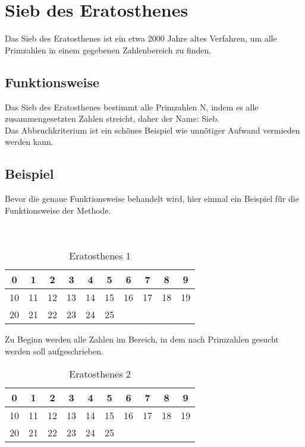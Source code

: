 

	\section{Sieb des Eratosthenes}
	 \label{sec:eratosthenes}
	Das Sieb des Eratosthenes ist ein etwa 2000 Jahre altes Verfahren, um alle Primzahlen in einem gegebenen Zahlenbereich zu finden. 
	\subsection{Funktionsweise}
	Das Sieb des Eratosthenes bestimmt alle Primzahlen N, indem es alle zusammengesetzten Zahlen streicht, daher der Name: Sieb.\\
	Das Abbruchkriterium ist ein sch\"önes Beispiel wie unn\"ötiger Aufwand vermieden werden kann.
	\subsection{Beispiel}
	Bevor die genaue Funktionsweise behandelt wird, hier einmal ein Beispiel f\"ür die Funktionsweise der Methode.\\
	\ \\
	\ \\
	\begin{table}[!ht] 
		\centering
		
		\begin{tabular}{|c|c|c|c|c|c|c|c|c|c|}
			\hline
			0  &  1 &  2 &  3 &  4 &  5 &  6 &  7 &  8 &  9 \\
			\hline
			10 & 11 & 12 & 13 & 14 & 15 & 16 & 17 & 18 & 19 \\
			\hline
			20 & 21 & 22 & 23 & 24 & 25 &  &  &  &  \\
			\hline
		\end{tabular}
		\caption{Eratosthenes 1}
		\label{tab:eratosthenes1}
	\end{table}
	
	Zu Beginn werden alle Zahlen im Bereich, in dem nach Primzahlen gesucht werden soll aufgeschrieben.
	
	\begin{table}[!ht] 
		\centering
		\begin{tabular}{|c|c|c|c|c|c|c|c|c|c|}
			\hline
			\cellcolor{red}0  &  \cellcolor{red}1 &  2 &  3 &  4 &  5 &  6 &  7 &  8 &  9 \\
			\hline
			10 & 11 & 12 & 13 & 14 & 15 & 16 & 17 & 18 & 19 \\
			\hline
			20 & 21 & 22 & 23 & 24 & 25 &  &  &  &  \\
			\hline
		\end{tabular}
		\caption{Eratosthenes 2}
		\label{tab:eratosthenes2}
	\end{table}
	
